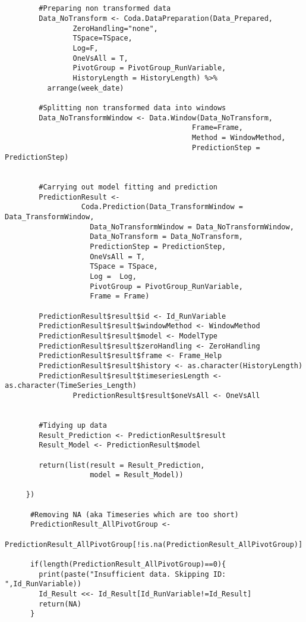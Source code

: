 \begin{verbatim}
        
        
        #Preparing non transformed data 
        Data_NoTransform <- Coda.DataPreparation(Data_Prepared,
				ZeroHandling="none",
				TSpace=TSpace, 
				Log=F, 
				OneVsAll = T,
				PivotGroup = PivotGroup_RunVariable,
				HistoryLength = HistoryLength) %>%
          arrange(week_date)
					
        #Splitting non transformed data into windows
        Data_NoTransformWindow <- Data.Window(Data_NoTransform,
                                            Frame=Frame,
                                            Method = WindowMethod,
                                            PredictionStep = PredictionStep)
        
        
        #Carrying out model fitting and prediction
        PredictionResult <- 
				  Coda.Prediction(Data_TransformWindow = Data_TransformWindow,
					Data_NoTransformWindow = Data_NoTransformWindow,
					Data_NoTransform = Data_NoTransform, 
					PredictionStep = PredictionStep,
					OneVsAll = T,
					TSpace = TSpace,
					Log =  Log,
					PivotGroup = PivotGroup_RunVariable,
					Frame = Frame)
					
        PredictionResult$result$id <- Id_RunVariable
        PredictionResult$result$windowMethod <- WindowMethod
        PredictionResult$result$model <- ModelType 
        PredictionResult$result$zeroHandling <- ZeroHandling
        PredictionResult$result$frame <- Frame_Help
        PredictionResult$result$history <- as.character(HistoryLength)
        PredictionResult$result$timeseriesLength <- as.character(TimeSeries_Length)
				PredictionResult$result$oneVsAll <- OneVsAll
      
          
        #Tidying up data
        Result_Prediction <- PredictionResult$result
        Result_Model <- PredictionResult$model
        
        return(list(result = Result_Prediction,
                    model = Result_Model))
        
     })
      
      #Removing NA (aka Timeseries which are too short)
      PredictionResult_AllPivotGroup <- 
			  PredictionResult_AllPivotGroup[!is.na(PredictionResult_AllPivotGroup)]
      
      if(length(PredictionResult_AllPivotGroup)==0){
        print(paste("Insufficient data. Skipping ID: ",Id_RunVariable))
        Id_Result <<- Id_Result[Id_RunVariable!=Id_Result]
        return(NA)
      }
    

\end{verbatim}
